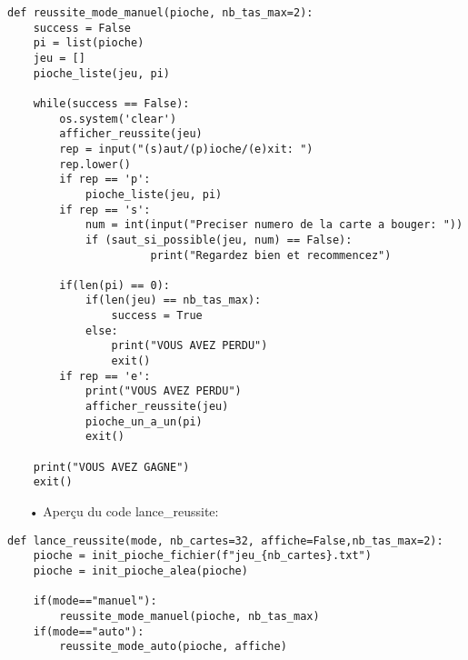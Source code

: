 	\lstset{language=Python}
	\lstset{frame=lines}
	\lstset{basicstyle=\footnotesize}
	\begin{lstlisting}
def reussite_mode_manuel(pioche, nb_tas_max=2):
    success = False
    pi = list(pioche)
    jeu = []
    pioche_liste(jeu, pi)

    while(success == False):
        os.system('clear')
        afficher_reussite(jeu)
        rep = input("(s)aut/(p)ioche/(e)xit: ")
        rep.lower()
        if rep == 'p':
            pioche_liste(jeu, pi)
        if rep == 's':
            num = int(input("Preciser numero de la carte a bouger: "))
            if (saut_si_possible(jeu, num) == False):
                      print("Regardez bien et recommencez")
        
        if(len(pi) == 0):
            if(len(jeu) == nb_tas_max):
                success = True
            else:
                print("VOUS AVEZ PERDU")
                exit()
        if rep == 'e':
            print("VOUS AVEZ PERDU")
            afficher_reussite(jeu)
            pioche_un_a_un(pi)
            exit()

    print("VOUS AVEZ GAGNE")
    exit()
	\end{lstlisting}
	
	\begin{itemize}
	\color{blue}\item[•]Aperçu du code lance\_reussite:
	\end{itemize}
	
	\lstset{language=Python}
	\lstset{frame=lines}
	\lstset{basicstyle=\footnotesize}
	\begin{lstlisting}
def lance_reussite(mode, nb_cartes=32, affiche=False,nb_tas_max=2):
    pioche = init_pioche_fichier(f"jeu_{nb_cartes}.txt")
    pioche = init_pioche_alea(pioche)

    if(mode=="manuel"):
        reussite_mode_manuel(pioche, nb_tas_max)
    if(mode=="auto"):
        reussite_mode_auto(pioche, affiche)	
	\end{lstlisting}